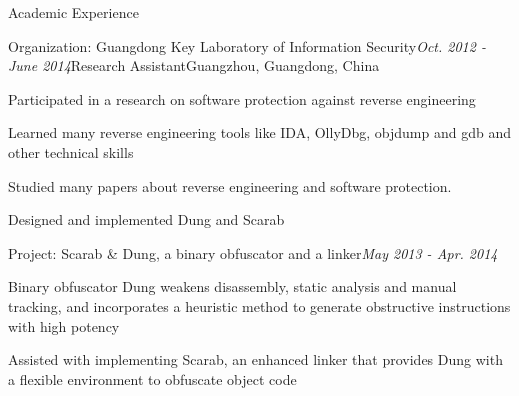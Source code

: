 \documentclass{resume} %
\begin{document}
\begin{rSection}{Academic Experience}

\begin{rSubsection}{Organization: Guangdong Key Laboratory of Information Security}{\em Oct. 2012 - June 2014}{Research Assistant}{Guangzhou, Guangdong, China}
\item Participated in a research on software protection against reverse engineering
\item Learned many reverse engineering tools like IDA, OllyDbg, objdump and gdb and other technical skills
\item Studied many papers about reverse engineering and software protection.
\item Designed and implemented Dung and Scarab
\end{rSubsection}


\begin{rSubsection}{Project: Scarab \& Dung, a binary obfuscator and a linker}{\em May 2013 - Apr. 2014}{}{}
\item Binary obfuscator Dung weakens disassembly, static analysis and manual tracking, and incorporates a heuristic method to generate obstructive instructions with high potency
\item Assisted with implementing Scarab, an enhanced linker that provides Dung with a flexible environment to obfuscate object code
\end{rSubsection}

\end{rSection}





\end{document}
